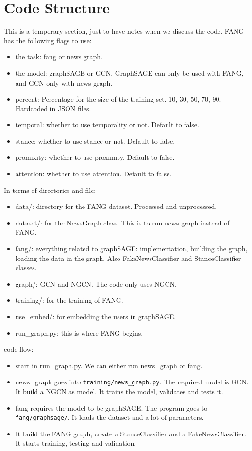 \section{Code Structure}
This is a temporary section, just to have notes when we discuss the code.
\newline
FANG has the following flags to use:
\begin{itemize}
    \item the task: fang or news graph.
    \item the model: graphSAGE or GCN. GraphSAGE can only be used with FANG, and GCN only with news graph.
    \item percent: Percentage for the size of the training set. 10, 30, 50, 70, 90. Hardcoded in JSON files.
    \item temporal: whether to use temporality or not. Default to false. 
    \item stance: whether to use stance or not. Default to false.
    \item promixity: whether to use proximity. Default to false.
    \item attention: whether to use attention. Default to false.

\end{itemize}
\vspace{5mm}
In terms of directories and file:
\begin{itemize}
    \item data/: directory for the FANG dataset. Processed and unprocessed.
    \item dataset/: for the NewsGraph class. This is to run news graph instead of FANG.
    \item fang/: everything related to graphSAGE: implementation, building the graph, loading the data in the graph. Also FakeNewsClassifier and StanceClassifier classes.
    \item graph/: GCN and NGCN. The code only uses NGCN.
    \item training/: for the training of FANG.
    \item use\_embed/: for embedding the users in graphSAGE.
    \item run\_graph.py: this is where FANG begins.
\end{itemize}
\vspace{5mm}

code flow:
\begin{itemize}
    \item start in run\_graph.py. We can either run news\_graph or fang.
    \item news\_graph goes into \verb|training/news_graph.py|. The required model is GCN. It build a NGCN as model. It trains the model, validates and tests it.
    \item fang requires the model to be graphSAGE. The program goes to \verb|fang/graphsage/|. It loads the dataset and a lot of parameters. 
    \item It build the FANG graph, create a StanceClassifier and a FakeNewsClassifier. It starts training, testing and validation.
\end{itemize}
